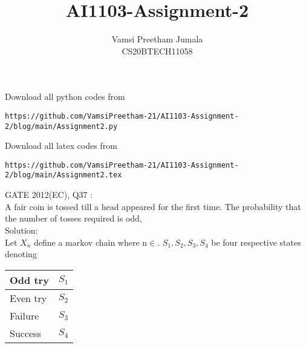 \documentclass[journal,12pt,twocolumn]{IEEEtran}
\begin{document}
\vspace{3cm}
\title{AI1103-Assignment-2}
\author{Vamsi Preetham Jumala\\CS20BTECH11058}
\maketitle
\newpage
\bigskip
\renewcommand{\thefigure}{\theenumi}
\renewcommand{\thetable}{\theenumi}
Download all python codes from
\begin{lstlisting}
https://github.com/VamsiPreetham-21/AI1103-Assignment-2/blog/main/Assignment2.py
\end{lstlisting}
Download all latex codes from
\begin{lstlisting}
https://github.com/VamsiPreetham-21/AI1103-Assignment-2/blog/main/Assignment2.tex
\end{lstlisting}
GATE 2012(EC), Q37 :\\
A fair coin is tossed till a head appeared for the first time. The probability that the number of tosses required is odd,\\
Solution:\\
Let $X_n$ define a markov chain where n$\in$. $S_1,S_2,S_3,S_4$ be four respective states denoting 
\begin{center}
\begin{tabular}{ | m{5em} | m{1cm}| } 
\hline
Odd try & $S_1$  \\ 
\hline
Even try & $S_2$ \\ 
\hline
Failure & $S_3$ \\ 
\hline
Success & $S_4$ \\
\hline
\end{tabular}
\end{center}
\\
\end{document}
